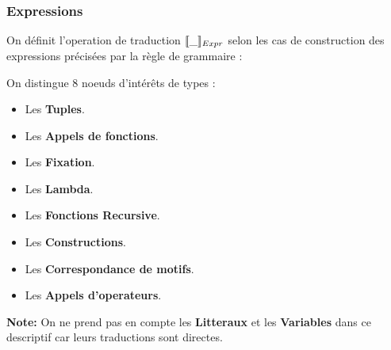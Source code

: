 \documentclass[12pt]{article}
\begin{document}
\subsubsection*{Expressions}\label{exprs}

On définit l'operation de traduction \(\llbracket \_ \rrbracket_{Expr}\) selon les cas de construction
des expressions précisées par la règle de grammaire : 

On distingue 8 noeuds d'intérêts de types :
\begin{itemize}
      \tightlist
      \item
            Les \textbf{Tuples}.
      \item
            Les \textbf{Appels de fonctions}.
      \item
            Les \textbf{Fixation}.
      \item
            Les \textbf{Lambda}.
      \item
            Les \textbf{Fonctions Recursive}.
      \item
            Les \textbf{Constructions}.
      \item
            Les \textbf{Correspondance de motifs}.
      \item
            Les \textbf{Appels d'operateurs}.
\end{itemize}
\textbf{Note:} On ne prend pas en compte les \textbf{Litteraux} et les \textbf{Variables} dans ce descriptif car leurs traductions sont directes.
\end{document}
